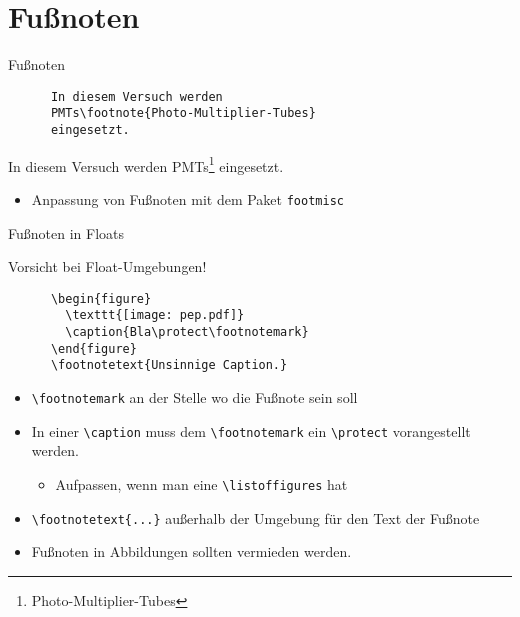 \section{Fußnoten}

\begin{frame}[fragile]{Fußnoten}
  \begin{CodeExample}{0.5}
    \begin{lstlisting}
      In diesem Versuch werden
      PMTs\footnote{Photo-Multiplier-Tubes}
      eingesetzt.
    \end{lstlisting}
    \CodeResult
      In diesem Versuch werden
      PMTs\footnote{Photo-Multiplier-Tubes}
      eingesetzt.
    \vspace{4cm}
  \end{CodeExample}
  \begin{itemize}
    \item Anpassung von Fußnoten mit dem Paket \texttt{footmisc}
  \end{itemize}
\end{frame}
\begin{frame}[fragile]{Fußnoten in Floats}
  \begin{alertblock}{Vorsicht bei Float-Umgebungen!}
    \begin{lstlisting}
      \begin{figure}
        \texttt{[image: pep.pdf]}
        \caption{Bla\protect\footnotemark}
      \end{figure}
      \footnotetext{Unsinnige Caption.}
    \end{lstlisting}
  \end{alertblock}
  \vspace{-1pt}
  \begin{itemize}
    \item \lstinline+\footnotemark+ an der Stelle wo die Fußnote sein soll
    \item In einer \lstinline+\caption+ muss dem \lstinline+\footnotemark+ ein \lstinline+\protect+ vorangestellt werden.
      \begin{itemize}
        \item Aufpassen, wenn man eine \lstinline+\listoffigures+ hat
      \end{itemize}
    \item \lstinline+\footnotetext{...}+ außerhalb der Umgebung für den Text der Fußnote
    \item Fußnoten in Abbildungen sollten vermieden werden.
  \end{itemize}
\end{frame}
